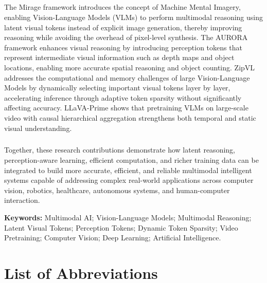 \documentclass[12pt,a4paper,final]{extreport}
\begin{document}
\paragraph{} The Mirage framework introduces the concept of Machine Mental Imagery, enabling Vision-Language Models (VLMs) to perform multimodal reasoning using latent visual tokens instead of explicit image generation, thereby improving reasoning while avoiding the overhead of pixel-level synthesis. The AURORA framework enhances visual reasoning by introducing perception tokens that represent intermediate visual information such as depth maps and object locations, enabling more accurate spatial reasoning and object counting. ZipVL addresses the computational and memory challenges of large Vision-Language Models by dynamically selecting important visual tokens layer by layer, accelerating inference through adaptive token sparsity without significantly affecting accuracy. LLaVA-Prime shows that pretraining VLMs on large-scale video with causal hierarchical aggregation strengthens both temporal and static visual understanding.

\paragraph{} Together, these research contributions demonstrate how latent reasoning, perception-aware learning, efficient computation, and richer training data can be integrated to build more accurate, efficient, and reliable multimodal intelligent systems capable of addressing complex real-world applications across computer vision, robotics, healthcare, autonomous systems, and human-computer interaction.

\vspace{0.5cm}
\noindent
\textbf{Keywords:} Multimodal AI; Vision-Language Models; Multimodal Reasoning; Latent Visual Tokens; Perception Tokens; Dynamic Token Sparsity; Video Pretraining; Computer Vision; Deep Learning; Artificial Intelligence.
\endgroup

\newpage

\thispagestyle{plain}
\begingroup
{}
\tableofcontents
\endgroup
\begingroup
{}
\listoffigures
{}
\listoftables
{}
\endgroup

\chapter*{List of Abbreviations}
\end{document}
